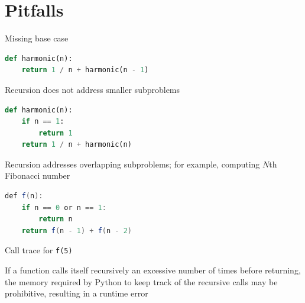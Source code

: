 \documentclass[8pt,a4paper,compress]{beamer}
\begin{document}
\section{Pitfalls}
\begin{frame}[fragile]
\pause

Missing base case
\begin{lstlisting}[language=Python,style=focusin]
def harmonic(n):
    return 1 / n + harmonic(n - 1)
\end{lstlisting}

\pause
\bigskip

Recursion does not address smaller subproblems
\begin{lstlisting}[language=Python,style=focusin]
def harmonic(n):
    if n == 1:
        return 1
    return 1 / n + harmonic(n)
\end{lstlisting}

\pause
\bigskip

\begin{minipage}{150pt}
Recursion addresses overlapping subproblems; for example, computing $N$th Fibonacci number

\begin{lstlisting}[language=Java,style=focusin]
def f(n):
    if n == 0 or n == 1:
        return n
    return f(n - 1) + f(n - 2)  
\end{lstlisting}
\end{minipage}
\begin{minipage}{150pt}
\begin{center}
Call trace for \lstinline{f(5)}

\smallskip

\end{center}
\end{minipage}

\pause
\bigskip

If a function calls itself recursively an excessive number of times before returning, the memory required by Python to keep track of the recursive calls may be prohibitive, resulting in a runtime error
\end{frame}
\end{document}
